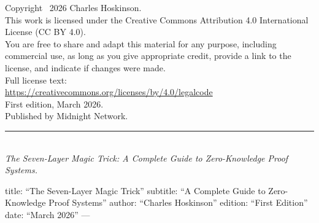 \documentclass[
  11pt,
  openany]{report}
\begin{document}

\newpage
\thispagestyle{empty}

\vspace*{\fill}

\begin{center}
\begin{minipage}{0.75\textwidth}

{\small\color{MidnightMuted}

\noindent Copyright \textcopyright\ 2026 Charles Hoskinson.\\[1.5em]

\noindent This work is licensed under the Creative Commons Attribution 4.0
International License (CC BY 4.0).\\[1em]

\noindent You are free to share and adapt this material for any purpose,
including commercial use, as long as you give appropriate credit, provide
a link to the license, and indicate if changes were made.\\[1em]

\noindent Full license text:\\
{\color{MidnightPurple}\url{https://creativecommons.org/licenses/by/4.0/legalcode}}\\[2em]

\noindent First edition, March 2026.\\[0.5em]
\noindent Published by Midnight Network.\\[2em]

{\color{MidnightGrey}\rule{0.3\textwidth}{0.5pt}}\\[1em]

\noindent\textit{The Seven-Layer Magic Trick: A Complete Guide to Zero-Knowledge Proof Systems.}

}

\end{minipage}
\end{center}

\vspace*{\fill}

\newpage

\renewcommand*\contentsname{Table of Contents}
{
\setcounter{tocdepth}{1}
\tableofcontents
}
title: ``The Seven-Layer Magic Trick'' subtitle: ``A Complete Guide to
Zero-Knowledge Proof Systems'' author: ``Charles Hoskinson'' edition: ``First
Edition'' date: ``March 2026'' ---
\end{document}
